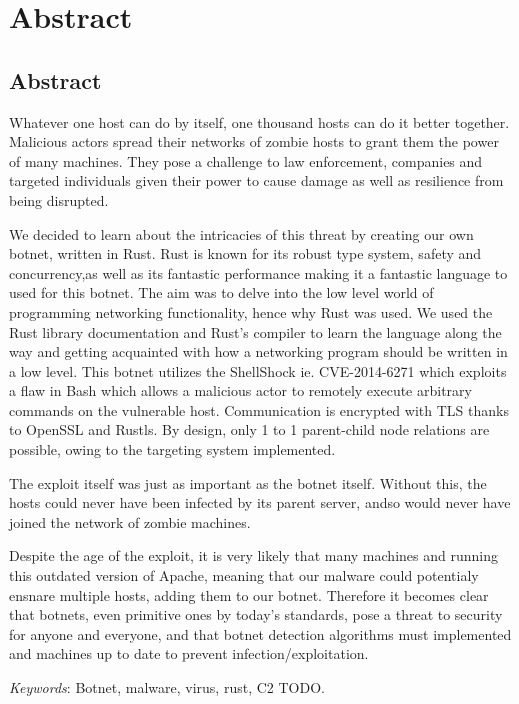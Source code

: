 \documentclass[../main.tex]{subfiles}
\begin{document}
    \newpage

	\chapter*{Abstract}

    \section*{Abstract}

Whatever one host can do by itself, one thousand hosts can do it better together. Malicious actors spread their networks of zombie hosts to grant them the power of many machines.
They pose a challenge to law enforcement, companies and targeted individuals given their power to cause damage as well as resilience from being disrupted.

We decided to learn about the intricacies of this threat by creating our own botnet, written in Rust. Rust is known for its robust type system, safety and concurrency,as well as its
fantastic performance making it a fantastic language to used for this botnet.
The aim was to delve into the low level world of programming networking functionality, hence why Rust was used. We used the Rust library documentation and Rust's compiler to learn
the language along the way and getting acquainted with how a networking program should be written in a low level.
This botnet utilizes the ShellShock ie. CVE-2014-6271 which exploits a flaw in Bash which allows a malicious actor to remotely execute arbitrary commands on the vulnerable host.
Communication is encrypted with TLS thanks to OpenSSL and Rustls. By design, only 1 to 1 parent-child node relations are possible, owing to the targeting system implemented.

The exploit itself was just as important as the botnet itself. Without this, the hosts could never have been infected by its parent server, andso would never have joined the network
of zombie machines.

Despite the age of the exploit, it is very likely that many machines and running this outdated version of Apache, meaning that our malware could potentialy ensnare multiple hosts,
adding them to our botnet. Therefore it becomes clear that botnets, even primitive ones by today's standards, pose a threat to security for anyone and everyone, and that botnet
detection algorithms must implemented and machines up to date to prevent infection/exploitation.



	\qquad \textit{Keywords}: Botnet, malware, virus, rust, C2 TODO.


	\vspace{10pt}
\end{document}
